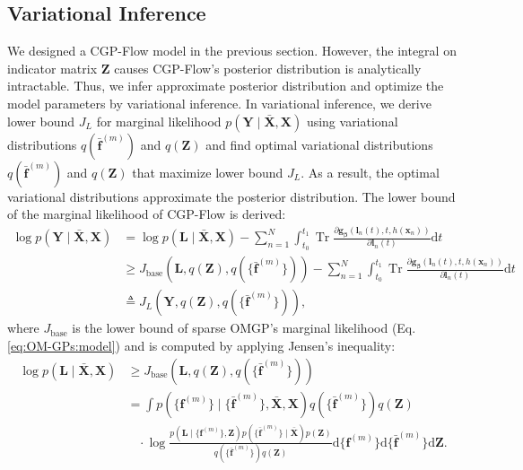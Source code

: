 \documentclass[sn-mathphys-num]{sn-jnl}
\begin{document}
\subsection{Variational Inference}
We designed a CGP-Flow model in the previous section. However, the integral on indicator matrix $\mathbf{Z}$ causes CGP-Flow's posterior distribution is analytically intractable.
Thus, we infer approximate posterior distribution and optimize the model parameters by variational inference.
In variational inference, we derive lower bound $J_L$ for marginal likelihood $p(\mathbf Y\mid \bar{\mathbf X}, \mathbf X)$ using variational distributions $q(\bar{\mathbf{f}}^{(m)})$ and $q(\mathbf Z)$
and find optimal variational distributions $q(\bar{\mathbf{f}}^{(m)})$ and $q(\mathbf Z)$ that maximize lower bound $J_L$.
As a result, the optimal variational distributions approximate the posterior distribution.
The lower bound of the marginal likelihood of CGP-Flow is derived:
\begin{align}
    \log p(\mathbf{Y}\mid \bar{\mathbf{X}}, \mathbf{X}) &= \log p({\mathbf{L}}\mid \bar{\mathbf X}, {\mathbf X}) 
    - \sum_{n=1}^{N} \int_{t_0}^{t_1} \operatorname{Tr} \frac{\partial {\mathbf g}_{\boldsymbol{\beta}}(\mathbf{l}_n(t),t,h({\mathbf x_n}))}{\partial \mathbf{l}_{n}(t)} \mathrm{d} t \nonumber \\
    & \geq J_\mathrm{base}({\mathbf L}, q({\mathbf{Z}}), q(\{\bar{\mathbf{f}}^{(m)}\})) 
    - \sum_{n=1}^{N} \int_{t_0}^{t_1} \operatorname{Tr} \frac{\partial {\mathbf g}_{\boldsymbol{\beta}}(\mathbf{l}_n(t),t,h({\mathbf x_n}))}{\partial \mathbf{l}_{n}(t)} \mathrm{d} t \nonumber \\
    & \triangleq J_L({\mathbf Y}, q({\mathbf{Z}}), q(\{\bar{\mathbf{f}}^{(m)}\})),
    \label{eq:cgpflows:likelihood}
\end{align}
where $J_\mathrm{base}$ is the lower bound of sparse OMGP's marginal likelihood (Eq. \ref{eq:OM-GPs:model}) and is computed by applying Jensen's inequality:
\begin{align}
    \log p({\mathbf{L}}\mid \bar{\mathbf X}, {\mathbf X}) &\geq J_\mathrm{base}({\mathbf L}, q({\mathbf{Z}}), q(\{\bar{\mathbf{f}}^{(m)}\})) \nonumber \\
    &=  \int p(\{\mathbf{f}^{(m)}\} \mid\{\bar{\mathbf{f}}^{(m)}\},\bar{\mathbf{X}}, \mathbf{X}) q(\{\bar{\mathbf{f}}^{(m)}\}) q(\mathbf{Z}) \nonumber \\
    & ~~~~ \cdot \log \frac{p(\mathbf{L} \mid\{\mathbf{f}^{(m)}\}, \mathbf{Z}) p(\{\bar{\mathbf{f}}^{(m)}\} \mid \bar{\mathbf{X}}) p(\mathbf{Z})}{q(\{\bar{\mathbf{f}}^{(m)}\}) q(\mathbf{Z})} 
    \mathrm{d}\{\mathbf{f}^{(m)}\} \mathrm{d}\{\bar{\mathbf{f}}^{(m)}\} \mathrm{d} \mathbf{Z}.
\end{align}
\end{document}
